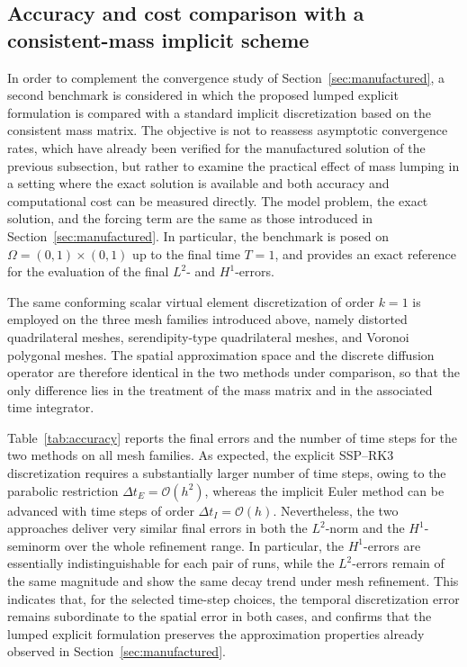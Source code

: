 \documentclass{article}
\begin{document}
\subsection{Accuracy and cost comparison with a consistent-mass implicit scheme}

In order to complement the convergence study of Section~\ref{sec:manufactured}, a second benchmark is considered in which the proposed lumped explicit formulation is compared with a standard implicit discretization based on the consistent mass matrix. The objective is not to reassess asymptotic convergence rates, which have already been verified for the manufactured solution of the previous subsection, but rather to examine the practical effect of mass lumping in a setting where the exact solution is available and both accuracy and computational cost can be measured directly. The model problem, the exact solution, and the forcing term are the same as those introduced in Section~\ref{sec:manufactured}. In particular, the benchmark is posed on $\Omega=(0,1)\times(0,1)$ up to the final time $T=1$, and provides an exact reference for the evaluation of the final $L^2$- and $H^1$-errors.

The same conforming scalar virtual element discretization of order $k=1$ is employed on the three mesh families introduced above, namely distorted quadrilateral meshes, serendipity-type quadrilateral meshes, and Voronoi polygonal meshes. The spatial approximation space and the discrete diffusion operator are therefore identical in the two methods under comparison, so that the only difference lies in the treatment of the mass matrix and in the associated time integrator.

Table~\ref{tab:accuracy} reports the final errors and the number of time steps for the two methods on all mesh families. As expected, the explicit SSP--RK3 discretization requires a substantially larger number of time steps, owing to the parabolic restriction $\Delta t_E=\mathcal{O}(h^2)$, whereas the implicit Euler method can be advanced with time steps of order $\Delta t_I=\mathcal{O}(h)$. Nevertheless, the two approaches deliver very similar final errors in both the $L^2$-norm and the $H^1$-seminorm over the whole refinement range. In particular, the $H^1$-errors are essentially indistinguishable for each pair of runs, while the $L^2$-errors remain of the same magnitude and show the same decay trend under mesh refinement. This indicates that, for the selected time-step choices, the temporal discretization error remains subordinate to the spatial error in both cases, and confirms that the lumped explicit formulation preserves the approximation properties already observed in Section~\ref{sec:manufactured}.
\end{document}
